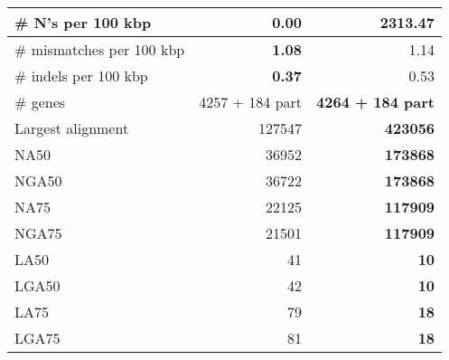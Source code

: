\documentclass[12pt,a4paper]{article}
\begin{document}
\begin{table}[ht]
\begin{center}
\begin{tabular}{|l*{2}{|r}|}
\# N's per 100 kbp & {\bf 0.00} & 2313.47 \\ \hline
\# mismatches per 100 kbp & {\bf 1.08} & 1.14 \\ \hline
\# indels per 100 kbp & {\bf 0.37} & 0.53 \\ \hline
\# genes & 4257 + 184 part & {\bf 4264 + 184 part} \\ \hline
Largest alignment & 127547 & {\bf 423056} \\ \hline
NA50 & 36952 & {\bf 173868} \\ \hline
NGA50 & 36722 & {\bf 173868} \\ \hline
NA75 & 22125 & {\bf 117909} \\ \hline
NGA75 & 21501 & {\bf 117909} \\ \hline
LA50 & 41 & {\bf 10} \\ \hline
LGA50 & 42 & {\bf 10} \\ \hline
LA75 & 79 & {\bf 18} \\ \hline
LGA75 & 81 & {\bf 18} \\ \hline
\end{tabular}
\end{center}
\end{table}
\end{document}

